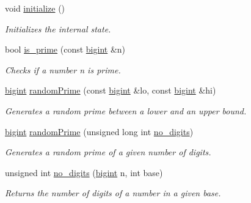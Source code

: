 \begin{DoxyCompactItemize}
\item 
void \mbox{\hyperlink{namespaceelGamal_1_1anonymous__namespace_02elGamal_8cpp_03_a0d4e747786cfe3b13f616cabca77654e}{initialize}} ()
\begin{DoxyCompactList}\small\item\em Initializes the internal state. \end{DoxyCompactList}\item 
bool \mbox{\hyperlink{namespaceelGamal_1_1anonymous__namespace_02elGamal_8cpp_03_a88b5bcec9edd3f2633f88d03249ff1d4}{is\+\_\+prime}} (const \mbox{\hyperlink{namespaceelGamal_ab2883bf41ce8d738e2428c8ae81b0245}{bigint}} \&n)
\begin{DoxyCompactList}\small\item\em Checks if a number n is prime. \end{DoxyCompactList}\item 
\mbox{\hyperlink{namespaceelGamal_ab2883bf41ce8d738e2428c8ae81b0245}{bigint}} \mbox{\hyperlink{namespaceelGamal_1_1anonymous__namespace_02elGamal_8cpp_03_a42d70441fa5e7410b3b77878cbc4ddfa}{random\+Prime}} (const \mbox{\hyperlink{namespaceelGamal_ab2883bf41ce8d738e2428c8ae81b0245}{bigint}} \&lo, const \mbox{\hyperlink{namespaceelGamal_ab2883bf41ce8d738e2428c8ae81b0245}{bigint}} \&hi)
\begin{DoxyCompactList}\small\item\em Generates a random prime between a lower and an upper bound. \end{DoxyCompactList}\item 
\mbox{\hyperlink{namespaceelGamal_ab2883bf41ce8d738e2428c8ae81b0245}{bigint}} \mbox{\hyperlink{namespaceelGamal_1_1anonymous__namespace_02elGamal_8cpp_03_a13863cb7d4c4e633937d3e86d03ab477}{random\+Prime}} (unsigned long int \mbox{\hyperlink{namespaceelGamal_1_1anonymous__namespace_02elGamal_8cpp_03_a4fd4ce5779202f36b700cb292fe5ad2b}{no\+\_\+digits}})
\begin{DoxyCompactList}\small\item\em Generates a random prime of a given number of digits. \end{DoxyCompactList}\item 
unsigned int \mbox{\hyperlink{namespaceelGamal_1_1anonymous__namespace_02elGamal_8cpp_03_a4fd4ce5779202f36b700cb292fe5ad2b}{no\+\_\+digits}} (\mbox{\hyperlink{namespaceelGamal_ab2883bf41ce8d738e2428c8ae81b0245}{bigint}} n, int base)
\begin{DoxyCompactList}\small\item\em Returns the number of digits of a number in a given base. \end{DoxyCompactList}\item 

\end{DoxyCompactItemize}

